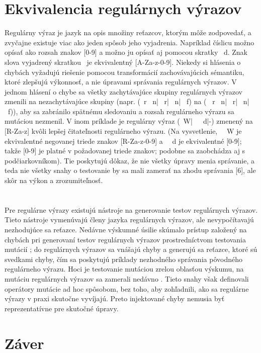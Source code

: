 \documentclass[10pt,twoside,slovak,a4paper]{article}
\begin{document}
\section{Ekvivalencia regulárnych výrazov}
Regulárny výraz je jazyk na opis množiny reťazcov, ktorým môže zodpovedať, a zvyčajne existuje viac ako jeden spôsob jeho vyjadrenia. 
Napríklad číslicu možno opísať ako rozsah znakov [0-9] a možno ju opísať aj pomocou skratky \ d. Znak slova vyjadrený skratkou \ je ekvivalentný [A-Za-z-0-9].
Niekedy si hlásenia o chybách vyžadujú riešenie pomocou transformácií zachovávajúcich sémantiku, ktoré zlepšujú výkonnosť, a nie úpravami správania regulárnych výrazov. \cite{Wang2019}
V jednom hlásení o chybe sa všetky zachytávajúce skupiny regulárnych výrazov zmenili na nezachytávajúce skupiny (napr. (\ r \ n| \ r| \ n| \ f) na ( \ r \ n| \ r| \ n| \ f)), aby sa zabránilo spätnému sledovaniu a rozsah regulárneho výrazu sa mutáciou nezmenil. V inom príklade je regulárny výraz (\ W|\ \ \ d|-) zmenený na [\wedge R-Za-z] kvôli lepšej čitateľnosti regulárneho výrazu. (Na vysvetlenie, \ \ W je ekvivalentné negovanej triede znakov [\wedge R-Za-z-0-9] a \ \ d je ekvivalentné [0-9]; takže [0-9] je platné v požadovanej triede znakov; podobne sa zaobchádza aj s podčiarkovníkom). \cite{Wang2019}
Tie poskytujú dôkaz, že nie všetky úpravy menia správanie, a teda nie všetky snahy o testovanie by sa mali zamerať na zhodu správania [6], ale skôr na výkon a zrozumiteľnosť.

\section{}
Pre regulárne výrazy \cite{} existujú nástroje na generovanie testov regulárnych výrazov. Tieto nástroje vymenúvajú členy jazyka regulárnych výrazov, ale nevypočítavajú nezhodujúce sa reťazce. Nedávne výskumné úsilie skúmalo prístup založený na chybách pri generovaní testov regulárnych výrazov prostredníctvom testovania mutácií \cite{}; do regulárnych výrazov sa vnášajú chyby a generujú sa reťazce, ktoré sú svedkami chyby, čím sa poskytujú príklady nezhodného správania pôvodného regulárneho výrazu. Hoci je testovanie mutáciou zrelou oblasťou výskumu, na mutáciu regulárnych výrazov sa zamerali nedávno \cite{}. Tieto snahy však definovali operátory mutácie ad hoc spôsobom, bez toho, aby zohľadnili, ako sa regulárne výrazy v praxi skutočne vyvíjajú. Preto injektované chyby nemusia byť reprezentatívne pre skutočné úpravy.

\section{Záver} \label{zaver} %





\end{document}
